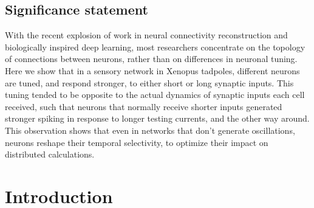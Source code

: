 \documentclass{article}
\begin{document}
\begin{flushleft}
\section*{Significance statement}
With the recent explosion of work in neural connectivity reconstruction and biologically inspired deep learning, most researchers concentrate on the topology of connections between neurons, rather than on differences in neuronal tuning. Here we show that in a sensory network in Xenopus tadpoles, different neurons are tuned, and respond stronger, to either short or long synaptic inputs. This tuning tended to be opposite to the actual dynamics of synaptic inputs each cell received, such that neurons that normally receive shorter inputs generated stronger spiking in response to longer testing currents, and the other way around. This observation shows that even in networks that don't generate oscillations, neurons reshape their temporal selectivity, to optimize their impact on distributed calculations. 
\bigskip

\end{flushleft} %

\section*{Introduction}



\end{document}
